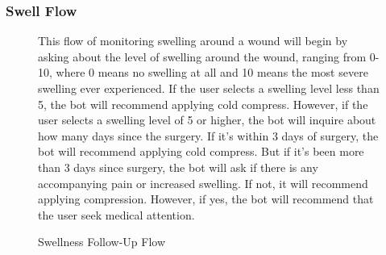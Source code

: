 \documentclass[12pt,oneside,openright,a4paper]{cpe-english-project}
\begin{document}
        \subsubsection{Swell Flow}
          \begin{figure}[H]
            \centering
            \caption{Swellness Follow-Up Flow}\label{fig:FollowUpFlow4}
            \begin{justify}
              \qquad This flow of monitoring swelling around a wound will begin by asking about the level of swelling around the wound, ranging from 0-10, where 0 means no swelling at all and 10 means the most severe swelling ever experienced. If the user selects a swelling level less than 5, the bot will recommend applying cold compress. However, if the user selects a swelling level of 5 or higher, the bot will inquire about how many days since the surgery. If it's within 3 days of surgery, the bot will recommend applying cold compress. But if it's been more than 3 days since surgery, the bot will ask if there is any accompanying pain or increased swelling. If not, it will recommend applying compression. However, if yes, the bot will recommend that the user seek medical attention.\par
            \end{justify}        
          \end{figure}
\end{document}
